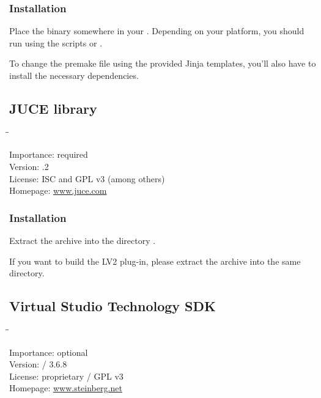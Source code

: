 \subsubsection{Installation}

Place the binary somewhere in your .  Depending on your
platform, you should run  using the scripts
 or .

To change the premake file using the provided Jinja templates, you'll
also have to install the necessary dependencies.

\subsection{JUCE library}

\begin{tabbing}
  \hspace*{6em}\=\=\kill

  Importance:  \> required \\
  Version:     .2 \\
  License:     \> ISC and GPL v3 (among others) \\
  Homepage:    \> \href{http://www.juce.com/}{www.juce.com}
\end{tabbing}

\subsubsection{Installation}

Extract the archive into the directory .

If you want to build the LV2 plug-in, please extract the archive
 into the same directory.

\subsection{Virtual Studio Technology SDK}

\begin{tabbing}
  \hspace*{6em}\=\=\kill

  Importance:  \> optional \\
  Version:      / 3.6.8 \\
  License:     \> proprietary / GPL v3 \\
  Homepage:    \> \href{http://www.steinberg.net/en/company/developer.html}{www.steinberg.net}
\end{tabbing}

